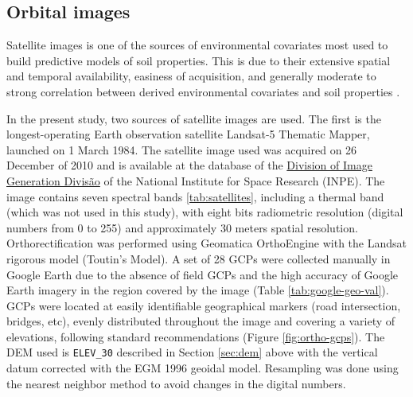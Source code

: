 \tocless\subsection{Orbital images}\label{sec:sat}

Satellite images is one of the sources of environmental covariates most used to build predictive models of soil properties. This is due to their extensive spatial and temporal availability, easiness of acquisition, and generally moderate to strong correlation between derived environmental covariates and soil properties \cite{BishopEtAl2001, Grunwald2009}.

In the present study, two sources of satellite images are used. The first is the longest-operating Earth observation satellite Landsat-5 Thematic Mapper, launched on 1 March 1984. The satellite image used was acquired on 26 December of 2010 and is available at the database of the \href{http://www.dgi.inpe.br/CDSR/}{Division of Image Generation Divisão} of the National Institute for Space Research (INPE). The image contains seven spectral bands \ref{tab:satellites}, including a thermal band (which was not used in this study), with eight bits radiometric resolution (digital numbers from 0 to 255) and approximately 30 meters spatial resolution. Orthorectification was performed using Geomatica\textregistered{} OrthoEngine\textregistered{} with the Landsat rigorous model (Toutin's Model). A set of 28 GCPs were collected manually in Google Earth\textregistered{} due to the absence of field GCPs and the high accuracy of Google Earth\textregistered{} imagery in the region covered by the image (Table \ref{tab:google-geo-val}). GCPs were located at easily identifiable geographical markers (road intersection, bridges, etc), evenly distributed throughout the image and covering a variety of elevations, following standard recommendations \cite{PCIGeomatics2007} (Figure \ref{fig:ortho-gcps}). The DEM used is \texttt{ELEV\_30} described in Section \ref{sec:dem} above with the vertical datum corrected with the EGM 1996 geoidal model. Resampling was done using the nearest neighbor method to avoid changes in the digital numbers.


